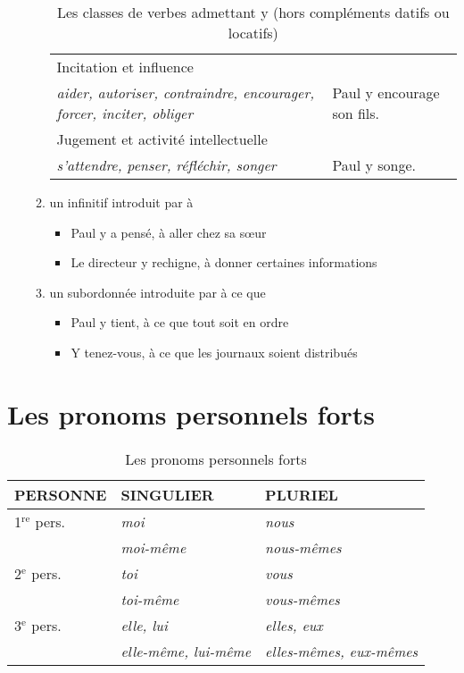 \documentclass[UTF8]{report}
\begin{document}
\begin{enumerate}
\begin{enumerate}
\begin{table}[H]
\begin{tabular}{|>{\RaggedRight\arraybackslash}p{8cm}|>{\RaggedRight\arraybackslash}p{5cm}|}
    Incitation et influence & \\
    \textit{aider, autoriser, contraindre, encourager, forcer, inciter, obliger} & Paul y encourage son fils. \\
    \hline

    Jugement et activité intellectuelle & \\
    \textit{s'attendre, penser, réfléchir, songer} & Paul y songe. \\
    \hline
    \end{tabular}
    \caption{Les classes de verbes admettant y (hors compléments datifs ou locatifs)}
    \end{table}
        \item un infinitif introduit par à
    \begin{itemize}
        \item Paul y a pensé, à aller chez sa sœur
        \item Le directeur y rechigne, à donner certaines informations
    \end{itemize}
    \item un subordonnée introduite par à ce que
    \begin{itemize}
        \item Paul y tient, à ce que tout soit en ordre
        \item Y tenez-vous, à ce que les journaux soient distribués 
    \end{itemize}
    
    \end{enumerate}
\end{enumerate}

\section{Les pronoms personnels forts}
\begin{table}[H]
\centering
\begin{tabular}{|l|l|l|}
\hline
\rowcolor{cyan!20}
\textbf{PERSONNE} & \textbf{SINGULIER} & \textbf{PLURIEL} \\
\hline
1$^{\text{re}}$ pers. & \textit{moi} & \textit{nous} \\
\cline{2-3}
& \textit{moi-même} & \textit{nous-mêmes} \\
\hline
2$^{\text{e}}$ pers. & \textit{toi} & \textit{vous} \\
\cline{2-3}
& \textit{toi-même} & \textit{vous-mêmes} \\
\hline
3$^{\text{e}}$ pers. & \textit{elle, lui} & \textit{elles, eux} \\
\cline{2-3}
& \textit{elle-même, lui-même} & \textit{elles-mêmes, eux-mêmes} \\
\hline
\end{tabular}
\caption{Les pronoms personnels forts}
\end{table}
\end{document}
